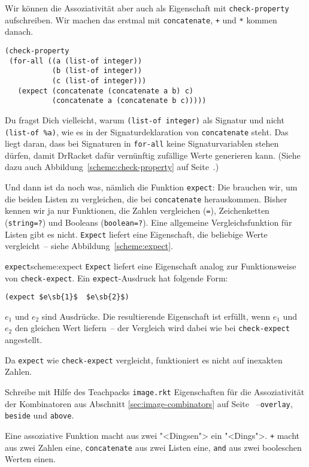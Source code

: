 Wir können die Assoziativität aber auch als Eigenschaft mit
\lstinline{check-property} aufschreiben.  Wir machen das erstmal mit
\lstinline{concatenate}, \lstinline{+} und \lstinline{*} kommen
danach.
%
\begin{lstlisting}
(check-property
 (for-all ((a (list-of integer))
           (b (list-of integer))
           (c (list-of integer)))
   (expect (concatenate (concatenate a b) c)
           (concatenate a (concatenate b c)))))
\end{lstlisting}
%
Du fragst Dich vielleicht, warum \lstinline{(list-of integer)} als
Signatur und nicht \lstinline{(list-of %a)},
wie es in der Signaturdeklaration von \lstinline{concatenate} steht.
Das liegt daran, dass bei Signaturen in \lstinline{for-all} keine
Signaturvariablen stehen dürfen, damit DrRacket dafür vernünftig
zufällige Werte generieren kann.  (Siehe dazu auch
Abbildung~\ref{scheme:check-property} auf
Seite~\pageref{scheme:check-property}.)

Und dann ist da noch was, nämlich die Funktion \lstinline{expect}: Die
brauchen wir, um die beiden Listen zu vergleichen, die bei
\lstinline{concatenate} herauskommen.  Bisher kennen wir ja nur
Funktionen, die Zahlen vergleichen (\lstinline{=}), Zeichenketten
(\lstinline{string=?}) und Booleans (\lstinline{boolean=?}).  Eine
allgemeine Vergleichsfunktion für Listen gibt es nicht.
\lstinline{Expect} liefert eine Eigenschaft, die beliebige Werte
vergleicht~-- siehe Abbildung~\ref{scheme:expect}.
%
\begin{feature}{\lstinline{expect}}{scheme:expect}
  \lstinline{Expect} liefert eine
  Eigenschaft analog zur Funktionsweise von
  \lstinline{check-expect}.  Ein \lstinline{expect}-Ausdruck hat folgende
  Form:
\begin{lstlisting}
(expect $e\sb{1}$  $e\sb{2}$)
\end{lstlisting}
%
$e_1$ und $e_2$ sind Ausdrücke.  Die resultierende Eigenschaft ist
erfüllt, wenn $e_1$ und $e_2$ den gleichen Wert liefern~-- der
Vergleich wird dabei wie bei \lstinline{check-expect} angestellt.

Da \lstinline{expect} wie \lstinline{check-expect} vergleicht,
funktioniert es nicht auf inexakten Zahlen.
\end{feature}
%
\begin{aufgabeinline}
  Schreibe mit Hilfe des Teachpacks \texttt{image.rkt} Eigenschaften
  für die Assoziativität der Kombinatoren aus Abschnitt
  \ref{sec:image-combinators} auf Seite \pageref{sec:image-combinators}~--\lstinline{overlay},
  \lstinline{beside} und \lstinline{above}.
\end{aufgabeinline}
%
Eine assoziative Funktion macht aus zwei "<Dingsen"> ein
"<Dings">.  \lstinline{+} macht aus zwei Zahlen eine,
\lstinline{concatenate} aus zwei Listen eine, \lstinline{and} aus zwei
booleschen Werten einen.

